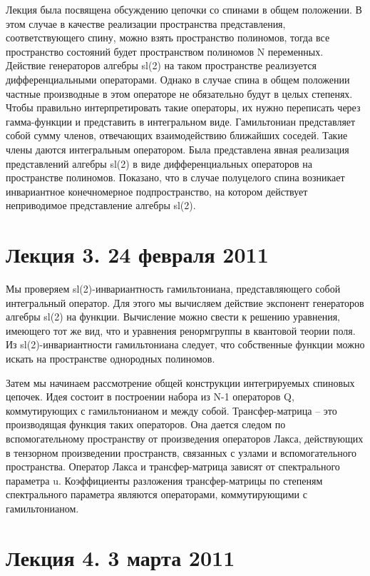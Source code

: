 \documentclass[a4paper,12pt]{article}
\theoremstyle{definition} \newtheorem{Def}{Definition}
\theoremstyle{definition}
\begin{document}
Лекция была посвящена обсуждению цепочки со спинами в общем положении. В этом случае в качестве реализации пространства представления, соответствующего спину, можно взять пространство полиномов, тогда все пространство состояний будет пространством полиномов N переменных. Действие генераторов алгебры sl(2) на таком пространстве реализуется дифференциальными операторами. Однако в случае спина в общем положении частные производные в этом операторе не обязательно будут в целых степенях. Чтобы правильно интерпретировать такие операторы, их нужно переписать через гамма-функции и представить в интегральном виде.
Гамильтониан представляет собой сумму членов, отвечающих взаимодействию ближайших соседей. Такие члены даются интегральным оператором.  Была представлена явная реализация представлений алгебры sl(2) в виде дифференциальных операторов на пространстве полиномов. Показано, что в случае полуцелого спина возникает инвариантное конечномерное подпространство, на котором действует неприводимое представление алгебры sl(2).

\section{Лекция 3. 24 февраля 2011}

Мы проверяем sl(2)-инвариантность гамильтониана, представляющего собой интегральный оператор. Для этого мы вычисляем действие экспонент генераторов алгебры sl(2) на функции. Вычисление можно свести к решению уравнения, имеющего тот же вид, что и уравнения ренормгруппы в квантовой теории поля. Из sl(2)-инвариантности гамильтониана следует, что собственные функции можно искать на пространстве однородных полиномов.

Затем мы начинаем рассмотрение общей конструкции интегрируемых спиновых цепочек. Идея состоит в построении набора из N-1 операторов Q, коммутирующих с гамильтонианом и между собой. Трансфер-матрица -- это производящая функция таких операторов. Она дается следом по вспомогательному пространству от произведения операторов Лакса, действующих в тензорном произведении пространств, связанных с узлами и вспомогательного пространства. Оператор Лакса и трансфер-матрица зависят от спектрального параметра u. Коэффициенты разложения трансфер-матрицы по степеням спектрального параметра являются операторами, коммутирующими с гамильтонианом.

\section{Лекция 4. 3 марта 2011}
\end{document}
